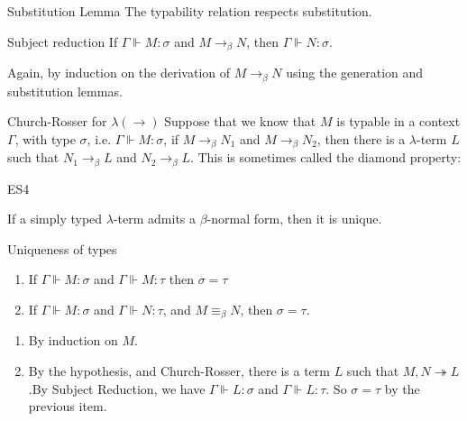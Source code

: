 \documentclass{article}
\numberwithin{thm}{subsection}
\begin{document}
\begin{fancylem}{Substitution Lemma}
    The typability relation respects substitution.
\end{fancylem}
\begin{fancyprop}{Subject reduction}
    If $\Gamma \Vdash M : \sigma$ and $M \to_{\beta} N$, then $\Gamma \Vdash N : \sigma$.
\end{fancyprop}
\proof Again, by induction on the derivation of $M \to_{\beta} N$ using the generation and substitution lemmas.
\begin{fancythm}{Church-Rosser for $\lambda(\to)$}
    Suppose that we know that $M$ is typable in a context $\Gamma$, with type $\sigma$, i.e. $\Gamma \Vdash M : \sigma$, if $M \to_{\beta} N_{1}$ and $M \to_{\beta} N_{2}$, then there is a $\lambda$-term $L$ such that $N_{1} \to_{\beta} L$ and $N_{2} \to_{\beta} L$. This is sometimes called the diamond property: \begin{center}
    \end{center}
\end{fancythm}
\proof ES4
\begin{corr}{}
    If a simply typed $\lambda$-term admits a $\beta$-normal form, then it is unique.
\end{corr}
\begin{fancyprop}{Uniqueness of types}
    \hspace{0.1cm}
    \begin{enumerate}
        \item If $\Gamma \Vdash M : \sigma$ and $\Gamma \Vdash M : \tau$ then $\sigma = \tau$
        \item If $\Gamma \Vdash M : \sigma$ and $\Gamma \Vdash N : \tau$, and $M \equiv_{\beta} N$, then $\sigma = \tau$.
    \end{enumerate}
\end{fancyprop}
\proof \hspace{0.1cm}
\begin{enumerate}
    \item By induction on $M$.
    \item By the hypothesis, and Church-Rosser, there is a term $L$ such that $M,N \twoheadrightarrow L$.\gap By Subject Reduction, we have $\Gamma \Vdash L : \sigma$ and $\Gamma \Vdash L : \tau$. So $\sigma = \tau$ by the previous item.
\end{enumerate}
\end{document}
